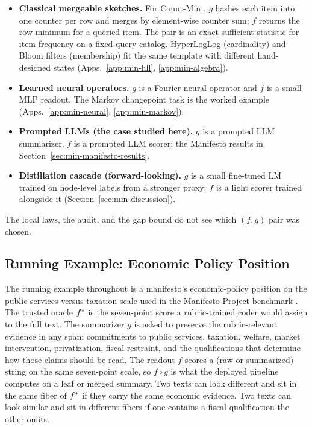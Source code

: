 \begin{itemize}[leftmargin=1.5em]
  \item \textbf{Classical mergeable sketches.} For Count-Min
    \citep{CormodeMuthukrishnan2005}, $g$ hashes each item into one
    counter per row and merges by element-wise counter sum; $f$
    returns the row-minimum for a queried item. The pair is an exact
    sufficient statistic for item frequency on a fixed query catalog.
    HyperLogLog (cardinality) and Bloom filters (membership) fit the
    same template with different hand-designed states
    (Apps.~\ref{app:min-hll}, \ref{app:min-algebra}).
  \item \textbf{Learned neural operators.} $g$ is a Fourier neural
    operator and $f$ is a small MLP readout. The Markov changepoint task
    is the worked example (Apps.~\ref{app:min-neural},
    \ref{app:min-markov}).
  \item \textbf{Prompted LLMs (the case studied here).} $g$ is a
    prompted LLM summarizer, $f$ is a prompted LLM scorer; the
    Manifesto results in Section~\ref{sec:min-manifesto-results}.
  \item \textbf{Distillation cascade (forward-looking).} $g$ is a small
    fine-tuned LM trained on node-level labels from a stronger proxy;
    $f$ is a light scorer trained alongside it
    (Section~\ref{sec:min-discussion}).
\end{itemize}

The local laws, the audit, and the gap bound do not see which $(f, g)$
pair was chosen.

\subsection{Running Example: Economic Policy Position}\label{sec:min-running-example}

The running example throughout is a manifesto's economic-policy
position on the public-services-versus-taxation scale used in the
Manifesto Project benchmark \citep{BenoitEtAl2025,ManifestoProject2025a}.
The trusted oracle $f^\ast$ is the seven-point score a rubric-trained
coder would assign to the full text. The summarizer $g$ is asked to
preserve the rubric-relevant evidence in any span: commitments to
public services, taxation, welfare, market intervention, privatization,
fiscal restraint, and the qualifications that determine how those
claims should be read. The readout $f$ scores a (raw or summarized)
string on the same seven-point scale, so $f\circ g$ is what the
deployed pipeline computes on a leaf or merged summary. Two texts can
look different and sit in the same fiber of $f^\ast$ if they carry the
same economic evidence. Two texts can look similar and sit in
different fibers if one contains a fiscal qualification the other
omits.

